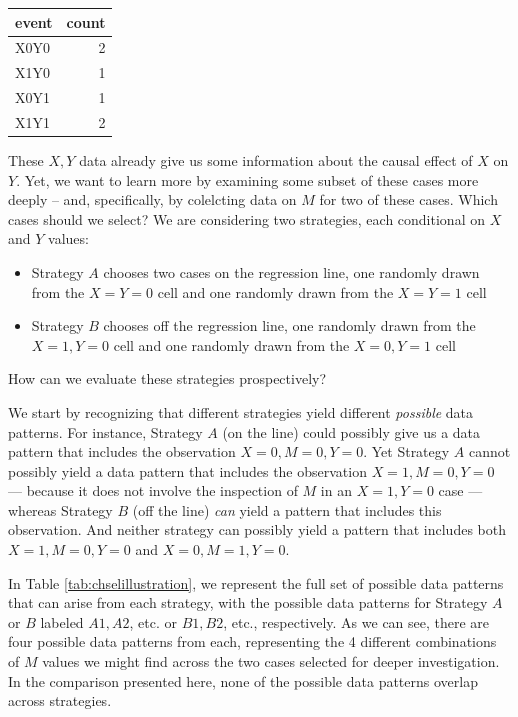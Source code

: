 \documentclass[
  12pt,
]{book}
\providecommand{\tightlist}{%
  \setlength{\itemsep}{0pt}\setlength{\parskip}{0pt}}
\begin{document}
\begin{tabular}{l|r}
\hline
event & count\\
\hline
X0Y0 & 2\\
\hline
X1Y0 & 1\\
\hline
X0Y1 & 1\\
\hline
X1Y1 & 2\\
\hline
\end{tabular}

These \(X,Y\) data already give us some information about the causal effect of \(X\) on \(Y\). Yet, we want to learn more by examining some subset of these cases more deeply -- and, specifically, by colelcting data on \(M\) for two of these cases. Which cases should we select? We are considering two strategies, each conditional on \(X\) and \(Y\) values:

\begin{itemize}
\tightlist
\item
  Strategy \(A\) chooses two cases on the regression line, one randomly drawn from the \(X=Y=0\) cell and one randomly drawn from the \(X=Y=1\) cell
\item
  Strategy \(B\) chooses off the regression line, one randomly drawn from the \(X=1, Y=0\) cell and one randomly drawn from the \(X=0, Y=1\) cell
\end{itemize}

How can we evaluate these strategies prospectively?

We start by recognizing that different strategies yield different \emph{possible} data patterns. For instance, Strategy \(A\) (on the line) could possibly give us a data pattern that includes the observation \(X=0, M=0, Y=0\). Yet Strategy \(A\) cannot possibly yield a data pattern that includes the observation \(X=1, M=0, Y=0\) --- because it does not involve the inspection of \(M\) in an \(X=1, Y=0\) case --- whereas Strategy \(B\) (off the line) \emph{can} yield a pattern that includes this observation. And neither strategy can possibly yield a pattern that includes both \(X=1, M=0, Y=0\) and \(X=0, M=1, Y=0\).

In Table \ref{tab:chselillustration}, we represent the full set of possible data patterns that can arise from each strategy, with the possible data patterns for Strategy \(A\) or \(B\) labeled \(A1, A2\), etc. or \(B1, B2\), etc., respectively. As we can see, there are four possible data patterns from each, representing the 4 different combinations of \(M\) values we might find across the two cases selected for deeper investigation. In the comparison presented here, none of the possible data patterns overlap across strategies.
\end{document}
